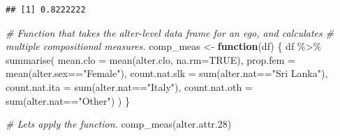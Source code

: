 \documentclass[
]{book}
\newenvironment{Shaded}{\begin{snugshade}}{\end{snugshade}}
\newcommand{\AttributeTok}[1]{\textcolor[rgb]{0.77,0.63,0.00}{#1}}
\newcommand{\CommentTok}[1]{\textcolor[rgb]{0.56,0.35,0.01}{\textit{#1}}}
\newcommand{\ConstantTok}[1]{\textcolor[rgb]{0.00,0.00,0.00}{#1}}
\newcommand{\ControlFlowTok}[1]{\textcolor[rgb]{0.13,0.29,0.53}{\textbf{#1}}}
\newcommand{\FloatTok}[1]{\textcolor[rgb]{0.00,0.00,0.81}{#1}}
\newcommand{\FunctionTok}[1]{\textcolor[rgb]{0.00,0.00,0.00}{#1}}
\newcommand{\NormalTok}[1]{#1}
\newcommand{\OtherTok}[1]{\textcolor[rgb]{0.56,0.35,0.01}{#1}}
\newcommand{\SpecialCharTok}[1]{\textcolor[rgb]{0.00,0.00,0.00}{#1}}
\newcommand{\StringTok}[1]{\textcolor[rgb]{0.31,0.60,0.02}{#1}}
\begin{document}
\begin{Shaded}
\end{Shaded}

\begin{verbatim}
## [1] 0.8222222
\end{verbatim}

\begin{Shaded}
\begin{Highlighting}[]
\CommentTok{\# Function that takes the alter{-}level data frame for an ego, and calculates}
\CommentTok{\# multiple compositional measures.}
\NormalTok{comp\_meas }\OtherTok{\textless{}{-}} \ControlFlowTok{function}\NormalTok{(df) \{}
\NormalTok{  df }\SpecialCharTok{\%\textgreater{}\%}
    \FunctionTok{summarise}\NormalTok{(}
      \AttributeTok{mean.clo =} \FunctionTok{mean}\NormalTok{(alter.clo, }\AttributeTok{na.rm=}\ConstantTok{TRUE}\NormalTok{), }
      \AttributeTok{prop.fem =} \FunctionTok{mean}\NormalTok{(alter.sex}\SpecialCharTok{==}\StringTok{"Female"}\NormalTok{), }
      \AttributeTok{count.nat.slk =} \FunctionTok{sum}\NormalTok{(alter.nat}\SpecialCharTok{==}\StringTok{"Sri Lanka"}\NormalTok{), }
      \AttributeTok{count.nat.ita =} \FunctionTok{sum}\NormalTok{(alter.nat}\SpecialCharTok{==}\StringTok{"Italy"}\NormalTok{), }
      \AttributeTok{count.nat.oth =} \FunctionTok{sum}\NormalTok{(alter.nat}\SpecialCharTok{==}\StringTok{"Other"}\NormalTok{)}
\NormalTok{    )}
\NormalTok{\}}

\CommentTok{\# Let\textquotesingle{}s apply the function.}
\FunctionTok{comp\_meas}\NormalTok{(alter.attr}\FloatTok{.28}\NormalTok{)}
\end{Highlighting}
\end{Shaded}
\end{document}
